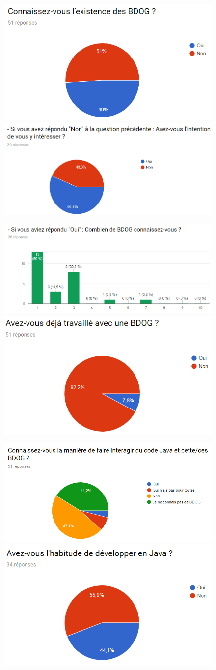 \documentclass[a4paper,fleqn,12pt,oneside]{book}
\begin{document}
\begin{figure}[htp]
\centering
    \includegraphics[width=.45\textwidth]{figures/5.png}\quad
    \includegraphics[width=.45\textwidth]{figures/6.png}
\end{figure}
\begin{figure}[htp]
\centering
    \includegraphics[width=.45\textwidth]{figures/7.png}\quad
    \includegraphics[width=.45\textwidth]{figures/8.png}
\end{figure}
\begin{figure}[htp]
\centering
    \includegraphics[width=.45\textwidth]{figures/9.png}\quad
    \includegraphics[width=.45\textwidth]{figures/10.png}
\end{figure}
\end{document}
